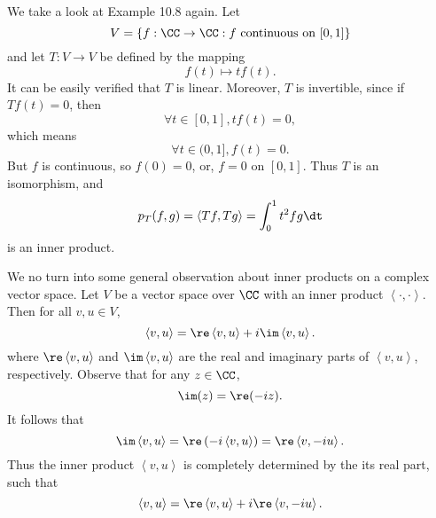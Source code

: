 \documentclass[linearalgebra]{subfiles}
\begin{document}
    \begin{example}
        We take a look at Example 10.8 again. Let
        \begin{equation*}
            V = \left\lbrace f:\CC\to\CC: f\text{ continuous on }[0,1] \right\rbrace 
        \end{equation*}
        and let $T:V\to V$ be defined by the mapping
        \begin{equation*}
            f(t)\mapsto tf(t).
        \end{equation*}
        It can be easily verified that $T$ is linear. Moreover, $T$ is invertible, since if $Tf(t) = 0$, then
        \begin{equation*}
            \forall t\in[0,1], tf(t) = 0,
        \end{equation*}
        which means
        \begin{equation*}
            \forall t\in(0,1], f(t) = 0.
        \end{equation*}
        But $f$ is continuous, so $f(0) = 0$, or, $f=0$ on $[0,1]$. Thus $T$ is an isomorphism, and
        \begin{equation*}
            p_T(f,g) = \left\langle Tf, Tg\right\rangle = \int^{1}_{0} t^2fg\dt
        \end{equation*}
        is an inner product.
    \end{example}

    \begin{remark}
        We no turn into some general observation about inner products on a complex vector space. Let $V$ be a vector space over $\CC$ with an inner product $\left\langle \cdot, \cdot\right\rangle $. Then for all $v,u\in V$,
        \begin{equation*}
            \left\langle v, u\right\rangle = \re\left\langle v, u\right\rangle + i\im\left\langle v, u\right\rangle .
        \end{equation*}
        where $\re\left\langle v, u\right\rangle$ and $\im\left\langle v, u\right\rangle$ are the real and imaginary parts of $\left\langle v, u\right\rangle $, respectively. Observe that for any $z\in\CC$,
        \begin{equation*}
            \im(z) = \re(-iz).
        \end{equation*}
        It follows that
        \begin{equation*}
            \im\left\langle v, u\right\rangle = \re\left( -i\left\langle v, u\right\rangle  \right) = \re\left\langle v, -iu\right\rangle .
        \end{equation*}
        Thus the inner product $\left\langle v,u \right\rangle$ is completely determined by the its real part, such that
        \begin{equation*}
            \left\langle v, u\right\rangle = \re\left\langle v, u\right\rangle + i\re\left\langle v, -iu\right\rangle.
        \end{equation*}
    \end{remark}
\end{document}
